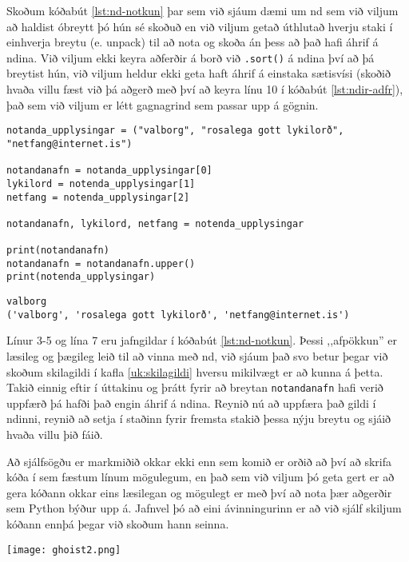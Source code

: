 Skoðum kóðabút \ref{lst:nd-notkun} þar sem við sjáum dæmi um nd sem við viljum að haldist óbreytt þó hún sé skoðuð en við viljum getað úthlutað hverju staki í einhverja breytu (e. unpack) til að nota og skoða án þess að það hafi áhrif á ndina.
Við viljum ekki keyra aðferðir á borð við \texttt{.sort()} á ndina því að þá breytist hún, við viljum heldur ekki geta haft áhrif á einstaka sætisvísi (skoðið hvaða villu fæst við þá aðgerð með því að keyra línu 10 í kóðabút \ref{lst:ndir-adfr}), það sem við viljum er létt gagnagrind sem passar upp á gögnin.




\begin{lstlisting}[caption=Ndir notaðar fyrir það sem þær eru gagnlegar, label=lst:nd-notkun]
notanda_upplysingar = ("valborg", "rosalega gott lykilorð", "netfang@internet.is")

notandanafn = notanda_upplysingar[0]
lykilord = notenda_upplysingar[1]
netfang = notenda_upplysingar[2]

notandanafn, lykilord, netfang = notenda_upplysingar

print(notandanafn)
notandanafn = notandanafn.upper()
print(notenda_upplysingar)
\end{lstlisting}
\lstset{style=uttak}
\begin{lstlisting}
valborg
('valborg', 'rosalega gott lykilorð', 'netfang@internet.is')
\end{lstlisting}
\lstset{style=venjulegt}

Línur 3-5 og lína 7 eru jafngildar í kóðabút \ref{lst:nd-notkun}.
Þessi ,,afpökkun'' er læsileg og þægileg leið til að vinna með nd, við sjáum það svo betur þegar við skoðum skilagildi í kafla \ref{uk:skilagildi} hversu mikilvægt er að kunna á þetta.
Takið einnig eftir í úttakinu og þrátt fyrir að breytan \texttt{notandanafn} hafi verið uppfærð þá hafði það engin áhrif á ndina.
Reynið nú að uppfæra það gildi í ndinni, reynið að setja í staðinn fyrir fremsta stakið þessa nýju breytu og sjáið hvaða villu þið fáið.

Að sjálfsögðu er markmiðið okkar ekki enn sem komið er orðið að því að skrifa kóða í sem fæstum línum mögulegum, en það sem við viljum þó geta gert er að gera kóðann okkar eins læsilegan og mögulegt er með því að nota þær aðgerðir sem Python býður upp á.
Jafnvel þó að eini ávinningurinn er að við sjálf skiljum kóðann ennþá þegar við skoðum hann seinna.

\begin{center}
	\texttt{[image: ghoist2.png]}
\end{center}

